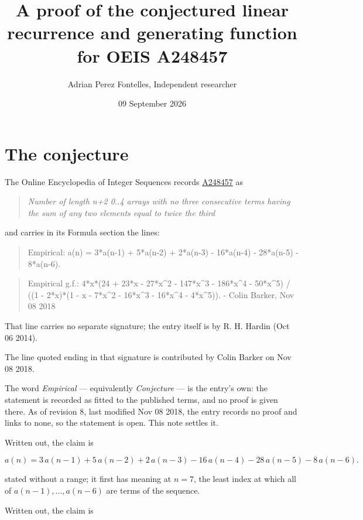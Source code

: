 \documentclass[11pt]{article}
\title{A proof of the conjectured linear recurrence and generating function for OEIS A248457}
\author{Adrian Perez Fontelles, Independent researcher}
\date{09 September 2026}
\theoremstyle{definition}
\begin{document}
\maketitle
\section{The conjecture}

The Online Encyclopedia of Integer Sequences records \href{https://oeis.org/A248457}{A248457} as

\begin{quote}\itshape Number of length n+2 0..4 arrays with no three consecutive terms having the sum of any two elements equal to twice the third\end{quote}

and carries in its Formula section the lines:

\begin{quote}\ttfamily Empirical: a(n) = 3*a(n-1) + 5*a(n-2) + 2*a(n-3) - 16*a(n-4) - 28*a(n-5) - 8*a(n-6).\end{quote}

\begin{quote}\ttfamily Empirical g.f.: 4*x*(24 + 23*x - 27*x\textasciicircum{}2 - 147*x\textasciicircum{}3 - 186*x\textasciicircum{}4 - 50*x\textasciicircum{}5) / ((1 - 2*x)*(1 - x - 7*x\textasciicircum{}2 - 16*x\textasciicircum{}3 - 16*x\textasciicircum{}4 - 4*x\textasciicircum{}5)). - Colin Barker, Nov 08 2018\end{quote}

That line carries no separate signature; the entry itself is by R. H. Hardin (Oct 06 2014).

The line quoted ending in that signature is contributed by Colin Barker on Nov 08 2018.

The word {\itshape Empirical} --- equivalently {\itshape Conjecture} --- is the entry's own: the statement is recorded as fitted to the published terms, and no proof is given there. As of revision 8, last modified Nov 08 2018, the entry records no proof and links to none, so the statement is open. This note settles it.

Written out, the claim is

\[a(n) = 3\,a(n-1) + 5\,a(n-2) + 2\,a(n-3) - 16\,a(n-4) - 28\,a(n-5) - 8\,a(n-6).\]

stated without a range; it first has meaning at $n = 7$, the least index at which all of $a(n-1),\dots,a(n-6)$ are terms of the sequence.

Written out, the claim is
\end{document}
